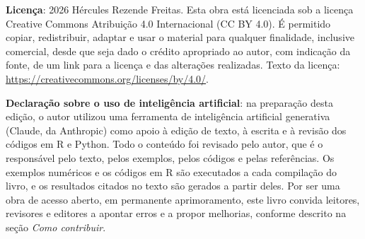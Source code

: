 {\begin{flushleft}
  \textbf{Licença}: \textcopyright{} 2026 Hércules Rezende Freitas. Esta obra está licenciada sob a
  licença Creative Commons Atribuição 4.0 Internacional (CC BY 4.0). É permitido copiar,
  redistribuir, adaptar e usar o material para qualquer finalidade, inclusive comercial, desde
  que seja dado o crédito apropriado ao autor, com indicação da fonte, de um link para a licença
  e das alterações realizadas. Texto da licença: \url{https://creativecommons.org/licenses/by/4.0/}.\par\medskip
  \textbf{Declaração sobre o uso de inteligência artificial}: na preparação desta edição, o autor
  utilizou uma ferramenta de inteligência artificial generativa (Claude, da Anthropic) como apoio
  à edição de texto, à escrita e à revisão dos códigos em R e Python. Todo o conteúdo foi revisado
  pelo autor, que é o responsável pelo texto, pelos exemplos, pelos códigos e pelas referências.
  Os exemplos numéricos e os códigos em R são executados a cada compilação do livro, e os
  resultados citados no texto são gerados a partir deles. Por ser uma obra de acesso aberto, em
  permanente aprimoramento, este livro convida leitores, revisores e editores a apontar erros e a
  propor melhorias, conforme descrito na seção \textit{Como contribuir}.\par
  \vfill
  \begin{center}
  \end{center}
  \end{flushleft}
  \clearpage
}
